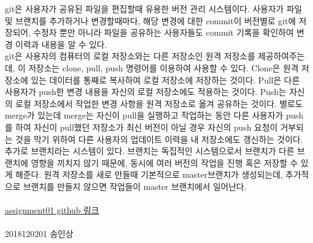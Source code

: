 \documentclass{article}
\begin{document}
git은 사용자가 공유된 파일을 편집할때 유용한 버전 관리 시스템이다. 사용자가 파일 및 브랜치를 추가하거나 변경할때마다, 해당 변경에 대한 commit이 버전별로 git에 저장되어, 수정자 뿐만 아니라 파일을 공유하는 사용자들도 commit 기록을 확인하여 변경 이력과 내용을 알 수 있다.  
\\git은 사용자의 컴퓨터의 로컬 저장소와는 다른 저장소인 원격 저장소를 제공하여주는데, 이 저장소는 clone, pull, push 명령어를 이용하여 사용할 수 있다. Clone은 원격 저장소에 있는 데이터를 통째로 복사하여 로컬 저장소에 저장하는 것이다. Pull은 다른 사용자가 push한 변경 내용을 자신의 로컬 저장소에도 적용하는 것이다. Push는 자신의 로컬 저장소에서 작업한 변경 사항을 원격 저장소로 옮겨 공유하는 것이다. 별로도 merge가 있는데 merge는 자신이 pull을 실행하고 작업하는 동안 다른 사용자가 push를 하여 자신이 pull했던 저장소가 최신 버전이 아닐 경우 자신의 push 요청이 거부되는 것을 막기 위하여 다른 사용자의 업데이트 이력을 내 저장소에도 갱신하는 것이다.  
\\추가로 브랜치라는 시스템이 있다. 브랜치는 독집적인 시스템으로서 브랜치가 다른 브랜치에 영향을 끼치지 않기 때문에, 동시에 여러 버전의 작업을 진행 혹은 저장할 수 있게 해준다. 원격 저장소를 새로 만들때 기본적으로 master브랜치가 생성되는데, 추가적으로 브랜치를 만들지 않으면 작업들이 master 브랜치에서 일어난다.
\\
\\
\href{https://github.com/johnjunior65/assignment01.git}{assignment01 github 링크}
\\
\\2018120201 송인상

\newpage
\begin{figure}[!p]

\end{figure}
\end{document}
